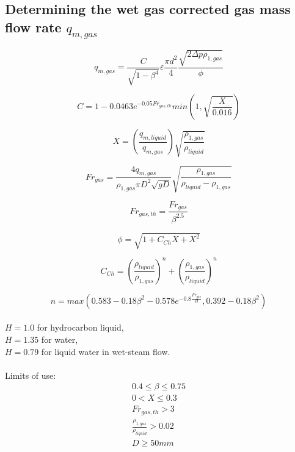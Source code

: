 \documentclass[journal]{IEEEtran}
\begin{document}
\subsection{Determining the wet gas corrected gas mass flow rate $q_{m,gas}$}

\begin{equation}
    q_{m,gas} = \frac{C}{\sqrt{1-\beta^{4}}}\varepsilon\frac{\pi d^{2}}{4}\frac{\sqrt{2\Delta p \rho_{1,gas}}}{\phi}
\end{equation}

\begin{equation}
    C = 1 - 0.0463 e^{-0.05 Fr_{gas,th}} min \left( 1, \sqrt{\frac{X}{0.016}} \right )
\end{equation}

\begin{equation}
    X = \left( \frac{q_{m,liquid}}{q_{m,gas}} \right)\sqrt{\frac{\rho_{1,gas}}{\rho_{liquid}}}
\end{equation}

\begin{equation}
    Fr_{gas} = \frac{4q_{m,gas}}{\rho_{1,gas} \pi D^{2} \sqrt{gD}} \sqrt{\frac{\rho_{1,gas}}{\rho_{liquid}-\rho_{1,gas}}}
\end{equation}

\begin{equation}
    Fr_{gas,th} = \frac{Fr_{gas}}{\beta ^{2.5}}
\end{equation}

\begin{equation}
    \phi = \sqrt{1+C_{Ch}X+X^2}
\end{equation}

\begin{equation}
    C_{Ch} = \left( \frac{\rho_{liquid}}{\rho_{1,gas}} \right) ^{n} +\left( \frac{\rho_{1,gas}}{\rho_{liquid}} \right) ^{n}
\end{equation}

\begin{equation}
    n = max \left( 0.583 - 0.18 \beta^{2} - 0.578 e^{-0.8 \frac{Fr_{gas}}{H}}, 0.392 - 0.18 \beta^{2} \right)
\end{equation}
\\
$H = 1.0$ for hydrocarbon liquid,\\
$H = 1.35$ for water,\\
$H = 0.79$ for liquid water in wet-steam flow.
\\
\\
Limits of use: \\
\begin{equation*}
\begin{aligned}
    0.4 \leq \beta \leq 0.75 \\
    0 < X \leq 0.3 \\
    Fr_{gas,th} > 3 \\
    \frac{\rho_{1,gas}}{\rho_{liquid}} > 0.02 \\
    D \geq 50 mm
\end{aligned}
\end{equation*}
\end{document}
